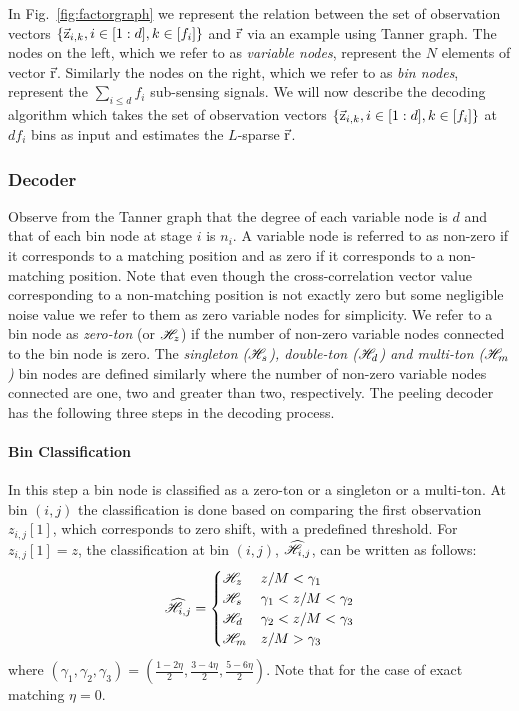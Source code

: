 In Fig.~\ref{fig:factorgraph} we represent the relation between the set of observation vectors $\{\vec{\mathrm{z}}_{i,k},i\in[1:d],k\in[f_i]\}$ and $\vec{\mathrm{r}}$ via an example using Tanner graph. The nodes on the left, which we refer to as {\it variable nodes}, represent the $N$ elements of vector $\vec{\mathrm{r}}$. Similarly the nodes on the right, which we refer to as {\it bin nodes}, represent the $\sum_{i\leq d} f_i$ sub-sensing signals. We will now describe the decoding algorithm which takes the set of observation vectors $\{\vec{\mathrm{z}}_{i,k},i\in[1:d],k\in[f_i]\}$ at $df_i$ bins as input and estimates the $L$-sparse $\vec{\mathrm{r}}$.	 

\subsubsection{Decoder}		
	Observe from the Tanner graph that the degree of each variable node is $d$ and that of each bin node at stage $i$ is $n_i$. A variable node is referred to as non-zero if it corresponds to a matching position and as zero if it corresponds to a non-matching position. Note that even though the cross-correlation vector value corresponding to a non-matching position is not exactly zero but some negligible noise value we refer to them as zero variable nodes for simplicity. We refer to a bin node as {\it zero-ton} (or $\mathscr{H}_z$) if the number of non-zero variable nodes connected to the bin node is zero. The {\it singleton ($\mathscr{H}_s$), double-ton ($\mathscr{H}_d$) and multi-ton ($\mathscr{H}_m$)} bin nodes are defined similarly where the number of non-zero variable nodes connected are one, two and greater than two, respectively. The peeling decoder has the following three steps in the decoding process.

\paragraph*{Bin Classification} In this step a bin node is classified as a zero-ton or a singleton or a multi-ton. At bin $(i,j)$ the classification is done based on  comparing the first observation $z_{i,j}[1]$, which corresponds to zero shift, with a predefined threshold. For $z_{i,j}[1]=z$, the classification at bin $(i,j)$, $\widehat{\mathscr{H}}_{i,j}$, can be written as follows:
\begin{align}
\label{Eqn:BinClassifApprox}
\widehat{\mathscr{H}}_{i,j}=
\begin{cases}
\mathscr{H}_z &  	 z/M < \gamma_1\\
\mathscr{H}_s &	  \gamma_1 < z/M < \gamma_2  \\
\mathscr{H}_d  &    \gamma_2  < z/M <  \gamma_3\\ 
\mathscr{H}_m &      z/M > \gamma_3\\
\end{cases}
\end{align}
where $(\gamma_1,\gamma_2,\gamma_3)=(\frac{1-2\eta}{2},\frac{3-4\eta}{2},\frac{5-6\eta}{2})$. Note that for the case of exact matching $\eta=0$.
